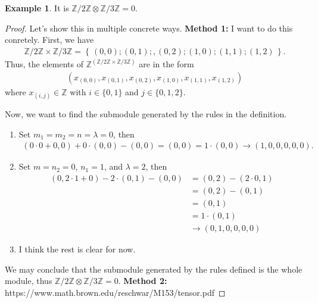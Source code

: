 \documentclass[a4paper]{book}
\theoremstyle{definition}
\newtheorem{example}{Example}[definition]
\newcommand{\set}[1]{\left\{\, #1 \,\right\}}
\begin{document}
\begin{exmbox}
    \begin{example}
        It is \(\mathbb{Z}/2\mathbb{Z} \otimes \mathbb{Z}/3\mathbb{Z} = 0\).
    \end{example}
\end{exmbox}
\begin{proof}
    Let's show this in multiple concrete ways.
    \newline
    \textbf{Method 1:}
    I want to do this conretely. First, we have
    \begin{align*}
        \mathbb{Z}/2\mathbb{Z} \times \mathbb{Z}/3\mathbb{Z} = \set{(0, 0); (0, 1);, (0, 2); (1, 0); (1, 1); (1, 2)} \text{.}
    \end{align*}
    Thus, the elements of \(\mathbb{Z}^{(\mathbb{Z}/2\mathbb{Z} \times \mathbb{Z}/3\mathbb{Z})}\) are in the form
    \begin{align*}
        (x_{(0, 0)}, x_{(0, 1)}, x_{(0, 2)}, x_{(1, 0)}, x_{(1, 1)}, x_{(1, 2)})
    \end{align*}
    where \(x_{(i, j)} \in \mathbb{Z}\) with \(i \in \{0, 1\}\) and \(j \in \{0, 1, 2\}\).

    Now, we want to find the submodule generated by the rules in the definition.

    \begin{enumerate}
        \item Set \(m_1 = m_2 = n = \lambda = 0\), then
        \begin{align*}
            (0 \cdot 0 + 0, 0) + 0 \cdot (0, 0) - (0, 0) = (0, 0) = 1 \cdot (0, 0) \rightarrow (1, 0, 0, 0, 0, 0) \text{.}
        \end{align*}
        \item Set \(m = n_2 = 0\), \(n_1 = 1\), and \(\lambda = 2\), then
        \begin{align*}
            (0, 2 \cdot 1 + 0) - 2 \cdot (0, 1) - (0, 0) &= (0, 2) - (2 \cdot 0, 1) \\
            &= (0, 2) - (0, 1) \\
            &= (0, 1) \\
            &= 1 \cdot (0, 1) \\
            &\rightarrow (0, 1, 0, 0, 0, 0)
        \end{align*}
        \item I think the rest is clear for now.
    \end{enumerate}
    We may conclude that the submodule generated by the rules defined is the whole module, thus \(\mathbb{Z}/2\mathbb{Z} \otimes \mathbb{Z}/3\mathbb{Z} = 0\).
    \newline
    \textbf{Method 2:}
    https://www.math.brown.edu/reschwar/M153/tensor.pdf
\end{proof}
\end{document}

